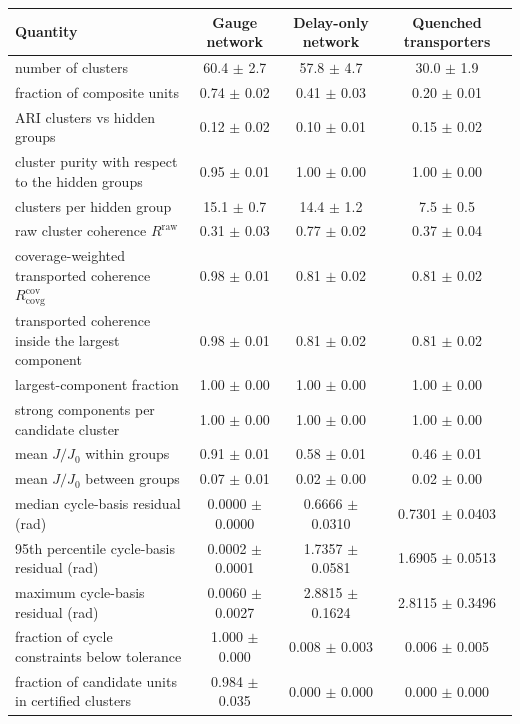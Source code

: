 \begin{tabular}{@{}lccc@{}}
\toprule
Quantity & Gauge network & Delay-only network & Quenched transporters \\
\midrule
number of clusters & 60.4 $\pm$ 2.7 & 57.8 $\pm$ 4.7 & 30.0 $\pm$ 1.9 \\
fraction of composite units & 0.74 $\pm$ 0.02 & 0.41 $\pm$ 0.03 & 0.20 $\pm$ 0.01 \\
ARI clusters vs hidden groups & 0.12 $\pm$ 0.02 & 0.10 $\pm$ 0.01 & 0.15 $\pm$ 0.02 \\
cluster purity with respect to the hidden groups & 0.95 $\pm$ 0.01 & 1.00 $\pm$ 0.00 & 1.00 $\pm$ 0.00 \\
clusters per hidden group & 15.1 $\pm$ 0.7 & 14.4 $\pm$ 1.2 & 7.5 $\pm$ 0.5 \\
raw cluster coherence $R^{\mathrm{raw}}$ & 0.31 $\pm$ 0.03 & 0.77 $\pm$ 0.02 & 0.37 $\pm$ 0.04 \\
coverage-weighted transported coherence $R^{\mathrm{cov}}_{\mathrm{covg}}$ & 0.98 $\pm$ 0.01 & 0.81 $\pm$ 0.02 & 0.81 $\pm$ 0.02 \\
transported coherence inside the largest component & 0.98 $\pm$ 0.01 & 0.81 $\pm$ 0.02 & 0.81 $\pm$ 0.02 \\
largest-component fraction & 1.00 $\pm$ 0.00 & 1.00 $\pm$ 0.00 & 1.00 $\pm$ 0.00 \\
strong components per candidate cluster & 1.00 $\pm$ 0.00 & 1.00 $\pm$ 0.00 & 1.00 $\pm$ 0.00 \\
mean $J/J_0$ within groups & 0.91 $\pm$ 0.01 & 0.58 $\pm$ 0.01 & 0.46 $\pm$ 0.01 \\
mean $J/J_0$ between groups & 0.07 $\pm$ 0.01 & 0.02 $\pm$ 0.00 & 0.02 $\pm$ 0.00 \\
median cycle-basis residual (rad) & 0.0000 $\pm$ 0.0000 & 0.6666 $\pm$ 0.0310 & 0.7301 $\pm$ 0.0403 \\
95th percentile cycle-basis residual (rad) & 0.0002 $\pm$ 0.0001 & 1.7357 $\pm$ 0.0581 & 1.6905 $\pm$ 0.0513 \\
maximum cycle-basis residual (rad) & 0.0060 $\pm$ 0.0027 & 2.8815 $\pm$ 0.1624 & 2.8115 $\pm$ 0.3496 \\
fraction of cycle constraints below tolerance & 1.000 $\pm$ 0.000 & 0.008 $\pm$ 0.003 & 0.006 $\pm$ 0.005 \\
fraction of candidate units in certified clusters & 0.984 $\pm$ 0.035 & 0.000 $\pm$ 0.000 & 0.000 $\pm$ 0.000 \\

\end{tabular}
